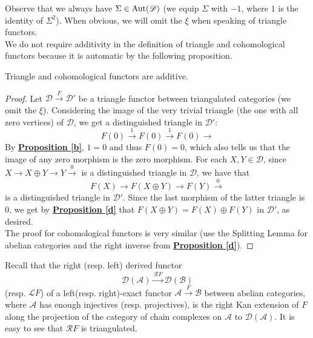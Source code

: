 Observe that we always have $\Sigma \in \textnormal{Aut}(\mathscr{D})$ (we equip $\Sigma$ with $-1$, where $1$ is the identity of $\Sigma^2$). When obvious, we will omit the $\xi$ when speaking of triangle functors. \\
We do not require additivity in the definition of triangle and cohomological functors because it is automatic by the following proposition. 

\begin{prop}
Triangle and cohomological functors are additive.
\end{prop}

\begin{proof}
Let $\mathscr{D} \overset{F}{\longrightarrow} \mathscr{D}'$ be a triangle functor between triangulated categories (we omit the $\xi$). Considering the image of the very trivial triangle (the one with all zero vertices) of $\mathscr{D}$, we get a distinguished triangle in $\mathscr{D}'$: $$F(0) \overset{1}{\longrightarrow} F(0) \overset{1}{\longrightarrow} F(0) \longrightarrow $$ 
By \hyperref[b]{\textbf{Proposition \ref*{b}}}, $1=0$ and thus $F(0)=0$, which also tells us that the image of any zero morphism is the zero morphism. For each $X,Y \in \mathscr{D}$, since $X \longrightarrow X \oplus Y  \longrightarrow Y \overset{0}{\longrightarrow}$ is a distinguished triangle in $\mathscr{D}$, we have that $$F(X) \longrightarrow F(X \oplus Y) \longrightarrow F(Y) \overset{0}{\longrightarrow}$$ is a distinguished triangle in $\mathscr{D}'$. Since the last morphism of the latter triangle is $0$, we get by \hyperref[d]{\textbf{Proposition \ref*{d}}} that $F( X \oplus Y)= F(X) \oplus F(Y)$ in $\mathscr{D}'$, as desired. \\
The proof for cohomological functors is very similar (use the Splitting Lemma for abelian categories and the right inverse from \hyperref[d]{\textbf{Proposition \ref*{d}}}).
\end{proof}

\begin{exmp}
Recall that the right (resp. left) derived functor $$\mathscr{D}(\mathscr{A}) \overset{\mathscr{R}F}{\longrightarrow} \mathscr{D}(\mathscr{B})$$ (resp. $\mathscr{L}F$) of a left(resp. right)-exact functor $\mathscr{A} \overset{F}{\longrightarrow} \mathscr{B}$ between abelian categories, where $\mathscr{A}$ has enough injectives (resp. projectives), is the right Kan extension of $F$ along the projection of the category of chain complexes on $\mathscr{A}$ to $\mathscr{D}(\mathscr{A})$. It is easy to see that $\mathscr{R}F$ is triangulated.
\end{exmp}

